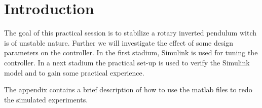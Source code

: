 \section{Introduction}
The goal of this practical session is to stabilize a rotary inverted pendulum witch is of unstable nature. Further we will investigate the effect of some design parameters on the controller. In the first stadium, Simulink is used for tuning the controller. In a next stadium the practical set-up is used to verify the Simulink model and to gain some practical experience.

The appendix contains a brief description of how to use the matlab files to redo the simulated experiments.